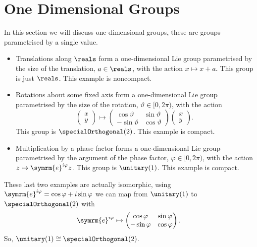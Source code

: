 \documentclass[fleqn]{NotesClass}
\newcommand{\e}{\symrm{e}}
\newcommand{\isomorphic}{\cong}
\begin{document}
    \section{One Dimensional Groups}
    In this section we will discuss one-dimensional groups, these are groups parametrised by a single value.
    \begin{exm}{}{}
        \begin{itemize}
            \item Translations along \(\reals\) form a one-dimensional Lie group parametrised by the size of the translation, \(a \in \reals\), with the action \(x \mapsto x + a\).
            This group is just \(\reals\).
            This example is noncompact.
            \item Rotations about some fixed axis form a one-dimensional Lie group parametrised by the size of the rotation, \(\vartheta \in [0, 2\pi)\), with the action
            \begin{equation}
                \begin{pmatrix}
                    x\\ y
                \end{pmatrix}
                \mapsto
                \begin{pmatrix}
                    \cos\vartheta & \sin\vartheta\\
                    -\sin\vartheta & \cos\vartheta
                \end{pmatrix}
                \begin{pmatrix}
                    x\\ y
                \end{pmatrix}
                .
            \end{equation}
            This group is \(\specialOrthogonal(2)\).
            This example is compact.
            \item Multiplication by a phase factor forms a one-dimensional Lie group parametrised by the argument of the phase factor, \(\varphi \in [0, 2\pi)\), with the action \(z \mapsto \e^{i\varphi}z\).
            This group is \(\unitary(1)\).
            This example is compact.
        \end{itemize}
        These last two examples are actually isomorphic, using \(\e^{i\varphi} = \cos \varphi + i\sin \varphi\) we can map from \(\unitary(1)\) to \(\specialOrthogonal(2)\) with
        \begin{equation}
            \e^{i\varphi} \mapsto 
            \begin{pmatrix}
                \cos\varphi & \sin\varphi\\
                -\sin\varphi & \cos\varphi
            \end{pmatrix}
            .
        \end{equation}
        So, \(\unitary(1) \isomorphic \specialOrthogonal(2)\).
    \end{exm}
    
\end{document}
